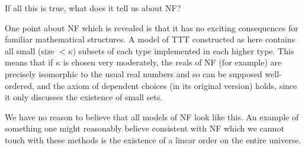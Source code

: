 \documentclass{slides}
\begin{document}
\begin{slide}

{\Large If all this is true, what does it tell us about NF?}

One point about NF which is revealed is that it has no exciting consequences for familiar mathematical structures.
A model of TTT constructed as here contains all small (size $<\kappa$) subsets of each type implemented in each higher type.  This means that if $\kappa$ is chosen very moderately, the reals of NF (for example) are precisely isomorphic to the usual real numbers and so can be supposed well-ordered, and the axiom of dependent choices (in its original version) holds, since it only discusses the existence of small sets.

We have no reason to believe that all models of NF look like this.  An example of something one might reasonably believe consistent with NF which we cannot touch with these methods is the existence of a linear order on the entire universe.


\end{slide}
\end{document}
